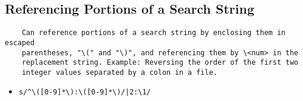 \documentclass[12pt]{article}
\begin{document}
    \subsection{Referencing Portions of a Search String}
    \begin{verbatim}
    Can reference portions of a search string by enclosing them in escaped
    parentheses, "\(" and "\)", and referencing them by \<num> in the 
    replacement string. Example: Reversing the order of the first two 
    integer values separated by a colon in a file.
    \end{verbatim}
    \begin{itemize}
        \item \begin{verbatim}s/^\([0-9]*\):\([0-9]*\)/|2:\1/\end{verbatim}
    \end{itemize}
    
\end{document}
